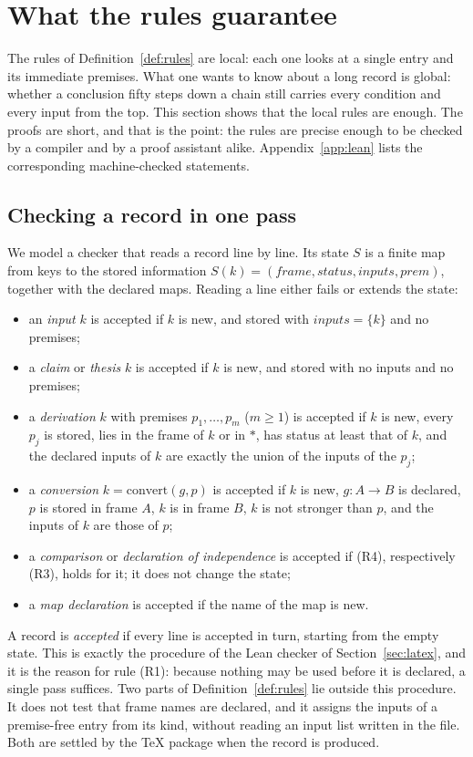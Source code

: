 \section{What the rules guarantee}\label{sec:properties}

The rules of Definition~\ref{def:rules} are local: each one looks at a single entry and its immediate premises. What one wants to know
about a long record is global: whether a conclusion fifty steps down a chain still carries every condition and every input from the top.
This section shows that the local rules are enough. The proofs are short, and that is the point: the rules are precise enough to be
checked by a compiler and by a proof assistant alike. Appendix~\ref{app:lean} lists the corresponding machine-checked statements.

\subsection{Checking a record in one pass}

We model a checker that reads a record line by line. Its state $S$ is a finite map from keys to the stored information
$S(k)=(\mathit{frame},\mathit{status},\mathit{inputs},\mathit{prem})$, together with the declared maps. Reading a line either fails or
extends the state:
\begin{itemize}[leftmargin=1.5em]
\item an \emph{input} $k$ is accepted if $k$ is new, and stored with $\mathit{inputs}=\{k\}$ and no premises;
\item a \emph{claim} or \emph{thesis} $k$ is accepted if $k$ is new, and stored with no inputs and no premises;
\item a \emph{derivation} $k$ with premises $p_1,\dots,p_m$ ($m\ge1$) is accepted if $k$ is new, every $p_j$ is stored, lies in the
frame of $k$ or in $*$, has status at least that of $k$, and the declared inputs of $k$ are exactly the union of the inputs of the $p_j$;
\item a \emph{conversion} $k=\mathrm{convert}(g,p)$ is accepted if $k$ is new, $g\colon A\to B$ is declared, $p$ is stored in frame $A$,
$k$ is in frame $B$, $k$ is not stronger than $p$, and the inputs of $k$ are those of $p$;
\item a \emph{comparison} or \emph{declaration of independence} is accepted if (R4), respectively (R3), holds for it; it does not change the state;
\item a \emph{map declaration} is accepted if the name of the map is new.
\end{itemize}
A record is \emph{accepted} if every line is accepted in turn, starting from the empty state. This is exactly the procedure of the
Lean checker of Section~\ref{sec:latex}, and it is the reason for rule (R1): because nothing may be used before it is declared, a single
pass suffices. Two parts of Definition~\ref{def:rules} lie outside this procedure. It does not test that frame names are declared, and
it assigns the inputs of a premise-free entry from its kind, without reading an input list written in the file. Both are settled by the
\TeX{} package when the record is produced.

